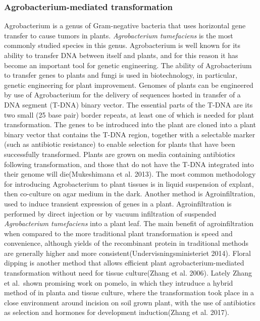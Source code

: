\documentclass[
]{article}
\begin{document}
\hypertarget{agrobacterium-mediated-transformation}{%
\subsubsection{Agrobacterium-mediated
transformation}\label{agrobacterium-mediated-transformation}}

Agrobacterium is a genus of Gram-negative bacteria that uses horizontal
gene transfer to cause tumors in plants. \emph{Agrobacterium
tumefaciens} is the most commonly studied species in this genus.
Agrobacterium is well known for its ability to transfer DNA between
itself and plants, and for this reason it has become an important tool
for genetic engineering. The ability of Agrobacterium to transfer genes
to plants and fungi is used in biotechnology, in particular, genetic
engineering for plant improvement. Genomes of plants can be engineered
by use of Agrobacterium for the delivery of sequences hosted in transfer
of a DNA segment (T-DNA) binary vector. The essential parts of the T-DNA
are its two small (25 base pair) border repeats, at least one of which
is needed for plant transformation. The genes to be introduced into the
plant are cloned into a plant binary vector that contains the T-DNA
region, together with a selectable marker (such as antibiotic
resistance) to enable selection for plants that have been successfully
transformed. Plants are grown on media containing antibiotics following
transformation, and those that do not have the T-DNA integrated into
their genome will die(Mukeshimana et al. 2013). The most common
methodology for introducing Agrobacterium to plant tissues is in liquid
suspension of explant, then co-culture on agar medium in the dark.
Another method is Agroinfiltration, used to induce transient expression
of genes in a plant. Agroinfiltration is performed by direct injection
or by vacuum infiltration of suspended \emph{Agrobacterium tumefaciens}
into a plant leaf. The main benefit of agroinfiltration when compared to
the more traditional plant transformation is speed and convenience,
although yields of the recombinant protein in traditional methods are
generally higher and more consistent(Undervisningsministeriet 2014).
Floral dipping is another method that allows efficient plant
agrobacterium-mediated transformation without need for tissue
culture(Zhang et al. 2006). Lately Zhang et al.~shown promising work on
pomelo, in which they intruduce a hybrid method of in planta and tissue
culture, where the transformation took place in a close environment
around incision on soil grown plant, with the use of antibiotics as
selection and hormones for development induction(Zhang et al. 2017).
\end{document}
